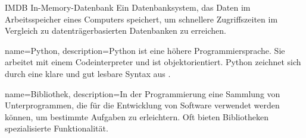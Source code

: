 \newglossaryentrywithacronym
{IMDB}
{In-Memory-Datenbank}
{Ein Datenbanksystem, das Daten im Arbeitsspeicher eines Computers speichert, um schnellere Zugriffszeiten im Vergleich zu datenträgerbasierten Datenbanken zu erreichen.}



{
        name=Python,
        description={Python ist eine höhere Programmiersprache. Sie arbeitet mit einem Codeinterpreter und ist objektorientiert. Python zeichnet sich durch eine klare und gut lesbare Syntax aus \cite{Pythondocumentation.20240309}.}
}

{
        name=Bibliothek,
        description={In der Programmierung eine Sammlung von Unterprogrammen, die für die Entwicklung von Software verwendet werden können, um bestimmte Aufgaben zu erleichtern. Oft bieten Bibliotheken  spezialisierte Funktionalität. \cite{Burkov.2019}}
}












